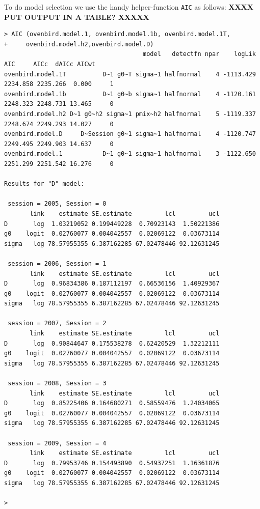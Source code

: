 To do model selection  we use the handy helper-function \mbox{\tt AIC}
as follows: {\bf XXXX PUT OUTPUT IN A TABLE? XXXXX}
{\small 
\begin{verbatim}
> AIC (ovenbird.model.1, ovenbird.model.1b, ovenbird.model.1T,
+     ovenbird.model.h2,ovenbird.model.D)
                                      model   detectfn npar    logLik      AIC     AICc  dAICc AICwt
ovenbird.model.1T          D~1 g0~T sigma~1 halfnormal    4 -1113.429 2234.858 2235.266  0.000     1
ovenbird.model.1b          D~1 g0~b sigma~1 halfnormal    4 -1120.161 2248.323 2248.731 13.465     0
ovenbird.model.h2 D~1 g0~h2 sigma~1 pmix~h2 halfnormal    5 -1119.337 2248.674 2249.293 14.027     0
ovenbird.model.D     D~Session g0~1 sigma~1 halfnormal    4 -1120.747 2249.495 2249.903 14.637     0
ovenbird.model.1           D~1 g0~1 sigma~1 halfnormal    3 -1122.650 2251.299 2251.542 16.276     0

Results for "D" model:

 session = 2005, Session = 0 
       link    estimate SE.estimate         lcl         ucl
D       log  1.03219052 0.199449228  0.70923143  1.50221386
g0    logit  0.02760077 0.004042557  0.02069122  0.03673114
sigma   log 78.57955355 6.387162285 67.02478446 92.12631245

 session = 2006, Session = 1 
       link    estimate SE.estimate         lcl         ucl
D       log  0.96834386 0.187112197  0.66536156  1.40929367
g0    logit  0.02760077 0.004042557  0.02069122  0.03673114
sigma   log 78.57955355 6.387162285 67.02478446 92.12631245

 session = 2007, Session = 2 
       link    estimate SE.estimate         lcl         ucl
D       log  0.90844647 0.175538278  0.62420529  1.32212111
g0    logit  0.02760077 0.004042557  0.02069122  0.03673114
sigma   log 78.57955355 6.387162285 67.02478446 92.12631245

 session = 2008, Session = 3 
       link    estimate SE.estimate         lcl         ucl
D       log  0.85225406 0.164680271  0.58559476  1.24034065
g0    logit  0.02760077 0.004042557  0.02069122  0.03673114
sigma   log 78.57955355 6.387162285 67.02478446 92.12631245

 session = 2009, Session = 4 
       link    estimate SE.estimate         lcl         ucl
D       log  0.79953746 0.154493890  0.54937251  1.16361876
g0    logit  0.02760077 0.004042557  0.02069122  0.03673114
sigma   log 78.57955355 6.387162285 67.02478446 92.12631245

> 

\end{verbatim}
}

